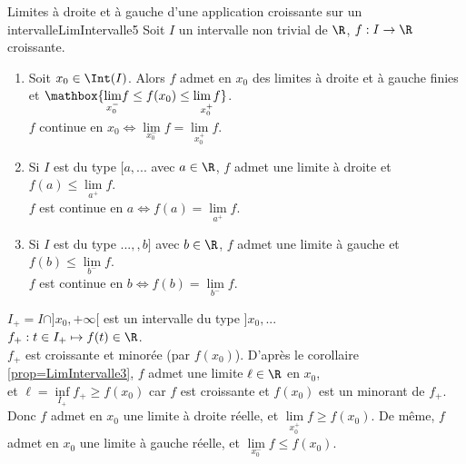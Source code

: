 \documentclass[12pt,a4paper]{report}
\begin{document}
\begin{theoreme}{Limites à droite et à gauche d'une application croissante sur un intervalle}{LimIntervalle5}
Soit $I$ un intervalle non trivial de $\R$, $f : I \to \R$ croissante. 
\begin{enumerate}
	\item Soit $x_0 \in \Int(I)$. Alors $f$ admet en $x_0$ des limites à droite et à gauche finies et $\mathbox{\underset{x_0^-}{\lim} f \leq f(x_0) \leq \underset{x_0^+}{\lim f}}$. \\
	$f$ continue en $x_0 \Longleftrightarrow \underset{x_0^-}{\lim} f = \underset{x_0^+}{\lim} f$.
	\item Si $I$ est du type $[a,...$ avec $a \in \R$, $f$ admet une limite à droite et $f(a) \leq \underset{a^+}{\lim} f$. \\
	$f$ est continue en $a \Longleftrightarrow f(a) = \underset{a^+}{\lim} f$.
	\item Si $I$ est du type $...,,b]$ avec $b \in \R$, $f$ admet une limite à gauche et $f(b) \leq \underset{b^-}{\lim} f$. \\
	$f$ est continue en $b \Longleftrightarrow f(b) = \underset{b^-}{\lim} f$.
\end{enumerate}
\end{theoreme}

\begin{demo}{}
$I_+ = I \cap ]x_0,+\infty[$ est un intervalle du type $]x_0,...$ \\
$f_+ : t \in I_+ \mapsto f(t) \in \R$. \\
$f_+$ est croissante et minorée (par $f(x_0)$). D'après le corollaire \ref{prop=LimIntervalle3}, $f$ admet une limite $\ell \in \R$ en $x_0$, \\
et $\ell = \underset{I_+}{\inf} f_+ \geq f(x_0)$ car $f$ est croissante et $f(x_0)$ est un minorant de $f_+$. \\
Donc $f$ admet en $x_0$ une limite à droite réelle, et $\underset{x_0^+}{\lim} f \geq f(x_0)$.
De même, $f$ admet en $x_0$ une limite à gauche réelle, et $\underset{x_0^-}{\lim} f \leq f(x_0)$.
\end{demo}
\end{document}
